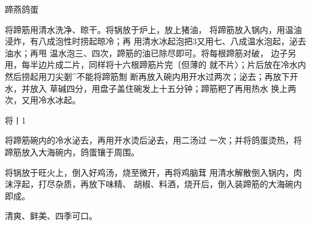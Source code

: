 \begin{recipe}{蹄燕鸽蛋}

\ingredients


\cooking

\step 将蹄筋用清水洗净、晾干。将锅放于炉上，放上猪油， 将蹄筋放入锅内，用温油浸炸，有八成泡性时捞起晾冷；再 用清水冰起泡把3又用七、八成温水泡起，泌去油水；再甩 温水泡三、四次，蹄筋的油已除尽即可。将每根蹄筋对破， 边子另用，每半边片成二片，同样将十六根蹄筋片完〔但薄的 就不片〉；片后放在冷水内然后捞起用刀尖剗^不能将蹄筋劁 断再放入碗内用开水过两次；泌去；再放下开水，并放入 草碱四分，用盘子盖住碗发上十五分钟；蹄筋粑了再用热水 换上两次，又用冷水冰起。

\step 将丨1%

\step 	将蹄筋碗内的冷水泌去，再用开水烫后泌去，用二汤过 一次；并将鸽蛋烫热，将蹄筋放入大海碗内，鸽蛋镶于周围。

\step 	将锅放于旺火上，倒入好鸡汤，烧至微开，再将鸡脑茸 用清水解散倒入锅内，肉沫浮起，打尽杂质，再放下味精、 胡椒、料酒，烧开后，倒入装蹄筋的大海碗内即成。

\notes

清爽、鲜美、四季可口。

\end{recipe}

